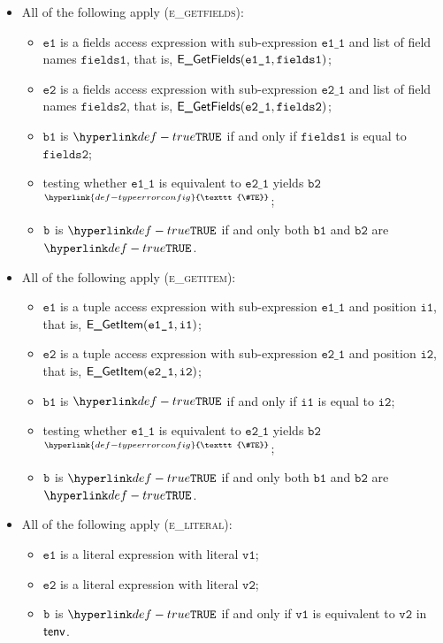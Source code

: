 \documentclass{book}
\newcommand\TypeErrorConfig[0]{\hyperlink{def-typeerrorconfig}{\texttt{\#TE}}}
\newcommand\ProseOrTypeError[0]{\hyperlink{def-proseortypeerror}{$^{\TypeErrorConfig}$}}
\newcommand\vione[0]{\texttt{i1}}
\newcommand\vitwo[0]{\texttt{i2}}
\newcommand\vvone[0]{\texttt{v1}}
\newcommand\vvtwo[0]{\texttt{v2}}
\newcommand\veone[0]{\texttt{e1}}
\newcommand\vetwo[0]{\texttt{e2}}
\newcommand\vfieldsone[0]{\texttt{fields1}}
\newcommand\vfieldstwo[0]{\texttt{fields2}}
\newcommand\veoneone[0]{\texttt{e1\_1}}
\newcommand\vetwoone[0]{\texttt{e2\_1}}
\newcommand\vbone[0]{\texttt{b1}}
\newcommand\vbtwo[0]{\texttt{b2}}
\begin{document}
\begin{itemize}
  \item All of the following apply (\textsc{e\_getfields}):
  \begin{itemize}
    \item $\veone$ is a fields access expression with sub-expression $\veoneone$ and list of field names $\vfieldsone$,
          that is, $\EGetFields(\veoneone, \vfieldsone)$;
    \item $\vetwo$ is a fields access expression with sub-expression $\vetwoone$ and list of field names $\vfieldstwo$,
          that is, $\EGetFields(\vetwoone, \vfieldstwo)$;
    \item $\vbone$ is $\True$ if and only if $\vfieldsone$ is equal to $\vfieldstwo$;
    \item testing whether $\veoneone$ is equivalent to $\vetwoone$ yields $\vbtwo$ \ProseOrTypeError;
    \item $\texttt{b}$ is $\True$ if and only both $\vbone$ and $\vbtwo$ are $\True$.
  \end{itemize}

  \item All of the following apply (\textsc{e\_getitem}):
  \begin{itemize}
    \item $\veone$ is a tuple access expression with sub-expression $\veoneone$ and position $\vione$,
          that is, $\EGetItem(\veoneone, \vione)$;
    \item $\vetwo$ is a tuple access expression with sub-expression $\vetwoone$ and position $\vitwo$,
          that is, $\EGetItem(\vetwoone, \vitwo)$;
    \item $\vbone$ is $\True$ if and only if $\vione$ is equal to $\vitwo$;
    \item testing whether $\veoneone$ is equivalent to $\vetwoone$ yields $\vbtwo$ \ProseOrTypeError;
    \item $\texttt{b}$ is $\True$ if and only both $\vbone$ and $\vbtwo$ are $\True$.
  \end{itemize}

  \item All of the following apply (\textsc{e\_literal}):
  \begin{itemize}
    \item $\veone$ is a literal expression with literal $\vvone$;
    \item $\vetwo$ is a literal expression with literal $\vvtwo$;
    \item $\texttt{b}$ is $\True$ if and only if $\vvone$ is equivalent to $\vvtwo$ in $\textsf{tenv}$.
  \end{itemize}


\end{itemize}
\end{document}
